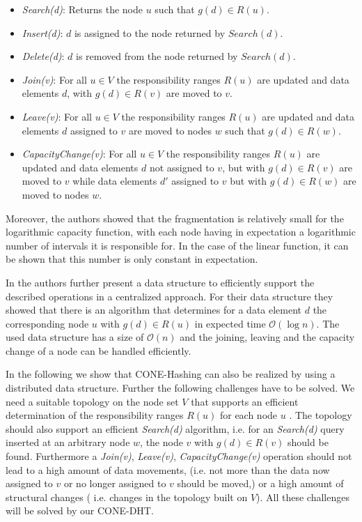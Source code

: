 \documentclass[11pt]{article}
\begin{document}
\begin{itemize}\itemsep0.1pt
        \item \emph{Search(d)}: Returns the node $u$ such that $g(d) \in
R(u)$.
        \item \emph{Insert(d)}: $d$ is assigned to  the node returned by $Search(d)$.
        \item \emph{Delete(d)}: $d$ is removed from the node returned by $Search(d)$.
        \item \emph{Join(v)}: For all $u \in V$ the responsibility ranges
$R(u)$ are updated and data elements $d$, with $g(d)\in R(v)$ are moved
to $v$.
        \item \emph{Leave(v)}: For all $u \in V$ the responsibility ranges
$R(u)$ are updated and data elements $d$ assigned to $v$ are moved to nodes
$w$ such that $g(d)\in R(w)$.
        \item \emph{CapacityChange(v)}: For all $u \in V$ the responsibility
ranges $R(u)$ are updated and data elements $d$ not assigned to $v$, but with $g(d)\in R(v)$ are moved to $v$ while data elements $d'$ assigned to $v$
but with $g(d)\in R(w)$ are moved to nodes $w$.
\end{itemize}

Moreover, the authors showed that the fragmentation is relatively small for the  logarithmic
capacity function, with each node having in expectation a logarithmic number of intervals it is responsible for.
In the case of the linear function, it can be shown that this number is only constant in expectation.

In \cite{cone} the authors further present a data structure to efficiently support the described
operations in a centralized approach. For their data structure they showed that
there is an algorithm that determines for a data element $d$ the
corresponding node $u$ with $g(d) \in R(u)$ in expected time $\mathcal
O(\log n)$. The used data structure has a size of $\mathcal O(n)$ and the
joining, leaving and the capacity change of a node can be handled efficiently.


In the following we show that CONE-Hashing can also be realized by using a
distributed data structure. Further the following challenges have to be
solved. We need a suitable topology on the node set $V$ that supports an
efficient determination of the responsibility ranges $R(u)$ for each node
$u$ . The topology should also support an efficient \emph{Search(d)}
algorithm, i.e. for an \emph{Search(d)} query inserted at an arbitrary node
$w$, the node $v$ with $g(d) \in R(v)$ should be found. Furthermore a
\emph{Join(v)}, \emph{Leave(v)}, \emph{CapacityChange(v)} operation should
not lead to a high amount of data movements, (i.e. not more than the data
now assigned to $v$ or no longer assigned to $v$ should be moved,) or a high amount of structural changes ( i.e. changes in the topology built on
$V$). All these challenges will be solved by our CONE-DHT.
\end{document}
